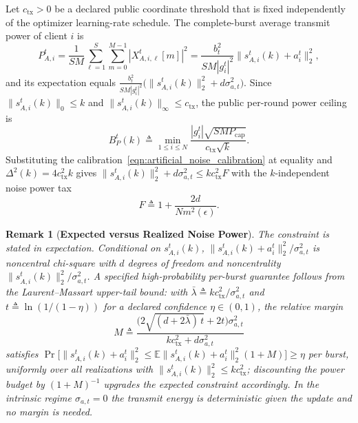 \documentclass[journal]{IEEEtran}
\newtheorem{remark}{Remark}
\begin{document}
Let $c_{\mathrm{tx}}>0$ be a declared public coordinate threshold that is fixed independently of the optimizer learning-rate schedule. The complete-burst average transmit power of client $i$ is
\begin{equation}
    P_{A,i}^{t}
    =\frac{1}{SM}\sum_{\ell=1}^{S}\sum_{m=0}^{M-1}|X_{A,i,\ell}^t[m]|^2
    =\frac{b_t^2}{SM|g_i^t|^2}\big\|s_{A,i}^t(k)+a_i^t\big\|_2^2,
\end{equation}
and its expectation equals $\frac{b_t^2}{SM|g_i^t|^2}\big(\|s_{A,i}^t(k)\|_2^2+d\sigma_{a,t}^2\big)$.
Since $\|s_{A,i}^t(k)\|_0\le k$ and $\|s_{A,i}^t(k)\|_\infty\le c_{\mathrm{tx}}$, the public per-round power ceiling is
\begin{equation}
    \label{eqn:power_ceiling}
    B_P^t(k)
    \triangleq
    \min_{1\le i\le N}
    \frac{|g_i^t|\sqrt{SM P_{\mathrm{cap}}}}
    {c_{\mathrm{tx}}\sqrt{k}}.
\end{equation}
Substituting the calibration~\eqref{eqn:artificial_noise_calibration} at equality and $\Delta^2(k)=4c_{\mathrm{tx}}^2k$ gives $\|s_{A,i}^t(k)\|_2^2+d\sigma_{a,t}^2\le kc_{\mathrm{tx}}^2F$ with the $k$-independent noise power tax
\begin{equation}
    \label{eqn:noise_power_tax}
    F\triangleq 1+\frac{2d}{N m^2(\epsilon)} .
\end{equation}
\begin{remark}[\bf Expected versus Realized Noise Power]
    \label{rem:chi_square}
    The constraint is stated in expectation. Conditional on $s_{A,i}^t(k)$, $\|s_{A,i}^t(k)+a_i^t\|_2^2/\sigma_{a,t}^2$ is noncentral chi-square with $d$ degrees of freedom and noncentrality $\|s_{A,i}^t(k)\|_2^2/\sigma_{a,t}^2$. A specified high-probability per-burst guarantee follows from the Laurent--Massart upper-tail bound: with $\bar\lambda\triangleq kc_{\mathrm{tx}}^2/\sigma_{a,t}^2$ and $t\triangleq\ln(1/(1-\eta))$ for a declared confidence $\eta\in(0,1)$, the relative margin
    \begin{equation}
        M\triangleq\frac{\big(2\sqrt{(d+2\bar\lambda)\,t}+2t\big)\sigma_{a,t}^2}{kc_{\mathrm{tx}}^2+d\sigma_{a,t}^2}
    \end{equation}
    satisfies $\Pr\big[\|s_{A,i}^t(k)+a_i^t\|_2^2\le\mathbb E\|s_{A,i}^t(k)+a_i^t\|_2^2(1+M)\big]\ge\eta$ per burst, uniformly over all realizations with $\|s_{A,i}^t(k)\|_2^2\le kc_{\mathrm{tx}}^2$; discounting the power budget by $(1+M)^{-1}$ upgrades the expected constraint accordingly. In the intrinsic regime $\sigma_{a,t}=0$ the transmit energy is deterministic given the update and no margin is needed.
\end{remark}
\end{document}
